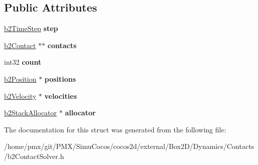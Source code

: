 \subsection*{Public Attributes}
\begin{DoxyCompactItemize}
\item 
\mbox{\label{structb2ContactSolverDef_a544604c01e6606ab54b8ccd5289a7ac7}} 
\hyperlink{structb2TimeStep}{b2\+Time\+Step} {\bfseries step}
\item 
\mbox{\label{structb2ContactSolverDef_a3401fb8f8856370ec6b4ee9a91e8bec8}} 
\hyperlink{classb2Contact}{b2\+Contact} $\ast$$\ast$ {\bfseries contacts}
\item 
\mbox{\label{structb2ContactSolverDef_ae977ea1cee4b7b9ee99210d9b66f88ea}} 
int32 {\bfseries count}
\item 
\mbox{\label{structb2ContactSolverDef_a3666aab878aca180722661c60974f8c3}} 
\hyperlink{structb2Position}{b2\+Position} $\ast$ {\bfseries positions}
\item 
\mbox{\label{structb2ContactSolverDef_a4e2f03f35656d8ce53d3607d18973845}} 
\hyperlink{structb2Velocity}{b2\+Velocity} $\ast$ {\bfseries velocities}
\item 
\mbox{\label{structb2ContactSolverDef_a9783fcacadf85e125e9c11f170111d62}} 
\hyperlink{classb2StackAllocator}{b2\+Stack\+Allocator} $\ast$ {\bfseries allocator}
\end{DoxyCompactItemize}


The documentation for this struct was generated from the following file\+:\begin{DoxyCompactItemize}
\item 
/home/pmx/git/\+P\+M\+X/\+Simu\+Cocos/cocos2d/external/\+Box2\+D/\+Dynamics/\+Contacts/b2\+Contact\+Solver.\+h\end{DoxyCompactItemize}
